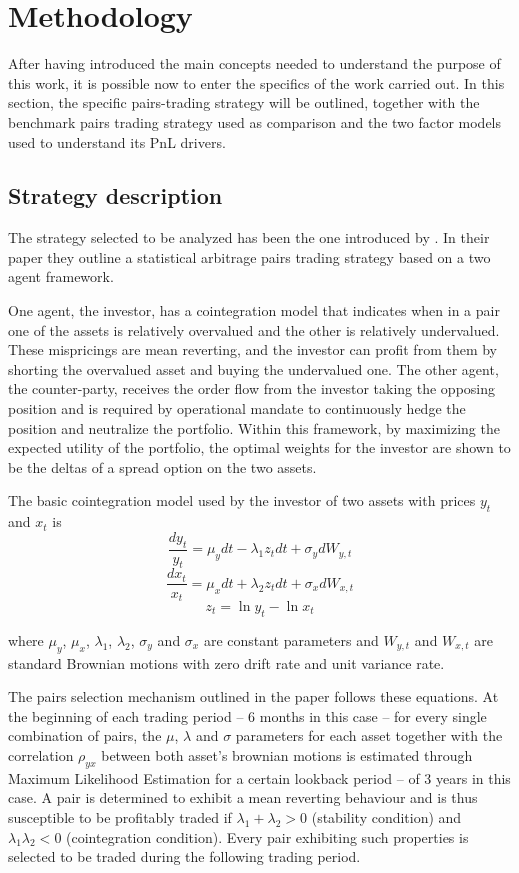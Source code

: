 \section{Methodology}
After having introduced the main concepts needed to understand the purpose of this work, it is possible now to enter the specifics of the work carried out. In this section, the specific pairs-trading strategy will be outlined, together with the benchmark pairs trading strategy used as comparison and the two factor models used to understand its PnL drivers.
\subsection{Strategy description}
The strategy selected to be analyzed has been the one introduced by \cite{ioannis_2023}. In their paper they outline a statistical arbitrage pairs trading strategy based on a two agent framework. 

One agent, the investor, has a cointegration model that indicates when in a pair one of the assets is relatively overvalued and the other is relatively undervalued. These mispricings are mean reverting, and the investor can profit from them by shorting the overvalued asset and buying the undervalued one. The other agent, the counter-party, receives the order flow from the investor taking the opposing position and is required by  operational mandate to continuously hedge the position and neutralize the portfolio. Within this framework, by maximizing the expected utility of the portfolio, the optimal weights for the investor are shown to be the deltas of a spread option on the two assets. 

The basic cointegration model used by the investor of two assets with prices $y_t$ and $x_t$ is 
\begin{equation}
    \frac{dy_t}{y_t}=\mu_ydt-\lambda_1z_tdt+\sigma_ydW_{y,t}
\end{equation}
\begin{equation}
    \frac{dx_t}{x_t}=\mu_xdt+\lambda_2z_tdt+\sigma_xdW_{x,t}
\end{equation}
\begin{equation}
    z_t=\ln y_t - \ln x_t
\end{equation}

where $\mu_y$, $\mu_x$, $\lambda_1$, $\lambda_2$, $\sigma_y$ and $\sigma_x$ are constant parameters and $W_{y,t}$ and $W_{x,t}$ are standard Brownian motions with zero drift rate and unit variance rate. 

The pairs selection mechanism outlined in the paper follows these equations. At the beginning of each trading period -- 6 months in this case -- for every single combination of pairs, the $\mu$, $\lambda$ and $\sigma$ parameters for each asset together with the correlation $\rho_{yx}$ between both asset's brownian motions is estimated through Maximum Likelihood Estimation for a certain lookback period -- of 3 years in this case. A pair is determined to exhibit a mean reverting behaviour and is thus susceptible to be profitably traded if $\lambda_1 + \lambda_2 > 0$ (stability condition) and $\lambda_1 \lambda_2 < 0$ (cointegration condition). Every pair exhibiting such properties is selected to be traded during the following trading period. 

